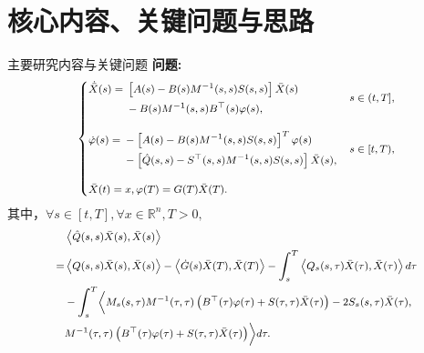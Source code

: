 \documentclass[aspectratio=169, 10pt]{ctexbeamer}
\begin{document}
	\section{核心内容、关键问题与思路}
	\begin{frame}{主要研究内容与关键问题}
		\textbf{问题:}
		\begin{equation*}
			{\footnotesize
			\left\{
			\begin{aligned}
				&\begin{aligned}
					\dot{\bar{X}}(s) ={} & \left[A(s)-B(s)M^{-1}(s,s)S(s,s)\right]\bar{X}(s) \\
					& -B(s)M^{-1}(s,s)B^\top(s)\varphi(s),
				\end{aligned}
				&& s\in(t,T], \\[8pt]
				&\begin{aligned}
					\dot{\varphi}(s) ={} & -\left[A(s)-B(s)M^{-1}(s,s)S(s,s)\right]^{T}\varphi(s) \\
					& -\left[\hat{Q}(s,s)-S^\top(s,s)M^{-1}(s,s)S(s,s)\right]\bar{X}(s),
				\end{aligned}
				&& s\in[t,T), \\[8pt]
				&\bar{X}(t) = x, \varphi(T) = G(T)\bar{X}(T).
			\end{aligned}
			\right.
			}
		\end{equation*}
		其中，${\forall s\in[t,T],\forall x\in\mathbb{R}^n,T>0,}$
		\begin{equation*}
			{\footnotesize
				\begin{aligned}
					&\left\langle\hat{Q}(s,s)\bar{X}(s),\bar{X}(s)\right\rangle \\
					= &\left\langle Q(s,s)\bar{X}(s),\bar{X}(s)\right\rangle - \left\langle \dot{G}(s)\bar{X}(T),\bar{X}(T) \right\rangle -\int_{s}^{T}\left\langle Q_s(s,\tau)\bar{X}(\tau),\bar{X}(\tau) \right\rangle d\tau \\
					&-\int_{s}^{T}\Bigl\langle M_s(s,\tau)M^{-1}(\tau,\tau)\left(B^\top(\tau)\varphi(\tau)+S(\tau,\tau)\bar{X}(\tau)\right)-2S_s(s,\tau)\bar{X}(\tau), \\
					& M^{-1}(\tau,\tau)\left(B^\top(\tau)\varphi(\tau)+S(\tau,\tau)\bar{X}(\tau)\right)\Bigr\rangle d\tau.
			\end{aligned}}
		\end{equation*}
	\end{frame}
\end{document}
